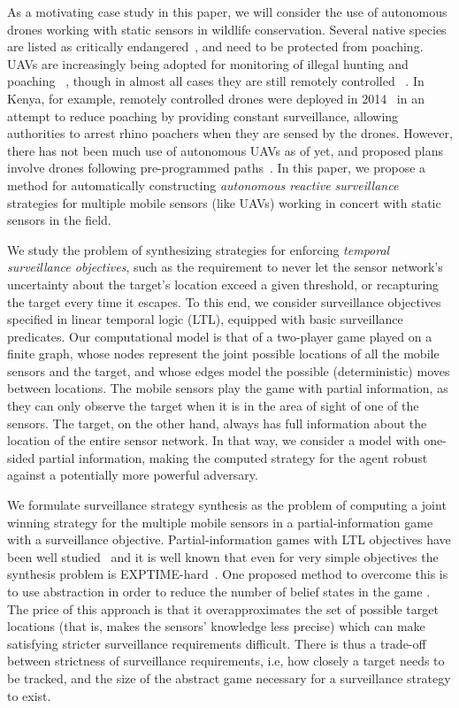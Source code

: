 As a motivating case study in this paper, we will consider the use of autonomous drones working with static sensors in wildlife conservation. Several native species are listed as critically endangered~\cite{mulero2014remotely}, and need to be protected from poaching. UAVs are increasingly being adopted for monitoring of illegal hunting and poaching ~\cite{schiffman2014drones}, though in almost all cases they are still remotely controlled ~\cite{mulero2014remotely}. In Kenya, for example, remotely controlled drones were deployed in 2014~\cite{Kenya} in an attempt to reduce poaching  by providing constant surveillance, allowing authorities to arrest rhino poachers when they are sensed by the drones. However, there has not been much use of autonomous UAVs as of yet, and proposed plans involve drones following pre-programmed paths~\cite{Koh12}. In this paper, we propose a method for automatically constructing  \emph{autonomous reactive surveillance} strategies for multiple mobile sensors (like UAVs) working in concert with static sensors in the field. 

We study the problem of synthesizing strategies for enforcing \emph{temporal surveillance objectives}, such as the requirement to never let the sensor network's uncertainty about the target's location exceed a given threshold, or recapturing the target every time it escapes. To this end, we consider surveillance objectives specified in linear temporal logic (LTL), equipped with basic surveillance predicates. Our computational model is that of a two-player game played on a finite graph, whose nodes represent the joint possible locations of all the mobile sensors and the target, and whose edges model the possible (deterministic) moves between locations. The mobile sensors play the game with partial information, as they can only observe the target when  it is in the area of sight of one of the sensors. The target, on the other hand, always has full information about the location of the entire sensor network. In that way, we consider a model with one-sided partial information, making the computed strategy for the agent robust against a potentially more powerful adversary. 

We formulate surveillance strategy synthesis as the problem of computing a joint winning strategy for the multiple mobile sensors in a partial-information game with a surveillance objective. Partial-information games with LTL objectives have been well studied~\cite{DoyenR11,Chatterjee2013} and it is well known that even for very simple objectives the synthesis problem is EXPTIME-hard~\cite{Reif84,BerwangerD08}. One proposed method to overcome this is to use abstraction in order to reduce the number of belief states in the game \cite{Bhar16}. The price of this approach is that it overapproximates the set of possible target locations (that is, makes the sensors' knowledge less precise) which can make satisfying stricter surveillance requirements difficult. There is thus a trade-off between strictness of surveillance requirements, i.e, how closely a target needs to be tracked, and the size of the abstract game necessary for a surveillance strategy to exist. 

